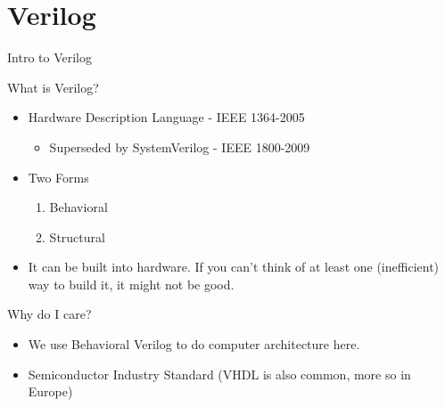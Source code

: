 \documentclass[table,dvipsnames,colorlinks=true]{beamer}
\begin{document}
\section{Verilog}
\begin{frame}{Intro to Verilog}
    \begin{block}{What is Verilog?}
        \begin{itemize}
            \item Hardware Description Language - IEEE 1364-2005
                \begin{itemize}
                    \item Superseded by SystemVerilog - IEEE 1800-2009
                \end{itemize}
            \item Two Forms
                \begin{enumerate}
                    \item Behavioral
                    \item Structural 
                \end{enumerate}
            \item It can be built into hardware. If you can't think of at
                least one (inefficient) way to build it, it might not be
                good.
        \end{itemize}
    \end{block}
    \begin{block}{Why do I care?}
        \begin{itemize}
            \item We use Behavioral Verilog to do computer architecture here.
            \item Semiconductor Industry Standard (VHDL is also common, more so in Europe)
        \end{itemize}
    \end{block}
\end{frame}
\end{document}

